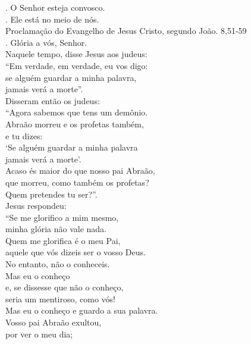 \documentclass{book}
\begin{document}
\begin{flushleft}
    {\color{VioletRed2} \Vbar.} O Senhor esteja convosco. \\
    {\color{VioletRed2} \Rbar.} Ele está no meio de nós.
    \vspace{.2cm} \\
    {\color{VioletRed2} \grecross} Proclamação do Evangelho de Jesus Cristo, segundo João.
    \hspace{\fill}
    \textcolor{VioletRed2}{8,51-59} \\
    {\color{VioletRed2} \Rbar.} Glória a vós, Senhor.
    \vspace{.2cm} \\
    Naquele tempo, disse Jesus aos judeus: \\
    ``Em verdade, em verdade, eu vos digo: \\
    se alguém guardar a minha palavra, \\
    jamais verá a morte''. \\
    Disseram então os judeus: \\
    ``Agora sabemos que tens um demônio. \\
    Abraão morreu e os profetas também, \\
    e tu dizes: \\
    `Se alguém guardar a minha palavra \\
    jamais verá a morte'. \\
    Acaso és maior do que nosso pai Abraão, \\
    que morreu, como também os profetas? \\
    Quem pretendes tu ser?''. \\
    Jesus respondeu: \\
    ``Se me glorifico a mim mesmo, \\
    minha glória não vale nada. \\
    Quem me glorifica é o meu Pai, \\
    aquele que vós dizeis ser o vosso Deus. \\
    No entanto, não o conheceis. \\
    Mas eu o conheço \\
    e, se dissesse que não o conheço, \\
    seria um mentiroso, como vós! \\
    Mas eu o conheço e guardo a sua palavra. \\
    Vosso pai Abraão exultou, \\
    por ver o meu dia; \\

\end{flushleft}
\end{document}
